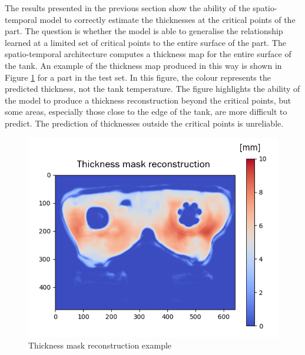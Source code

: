 The results presented in the previous section show the ability of the spatio-temporal model to correctly estimate the thicknesses at the critical points of the part. The question is whether the model is able to generalise the relationship learned at a limited set of critical points to the entire surface of the part. The spatio-temporal architecture computes a thickness map for the entire surface of the tank. An example of the thickness map produced in this way is shown in Figure \ref{fig:thickness_mask_reconstruction} for a part in the test set. 
In this figure, the colour represents the predicted thickness, not the tank temperature.
The figure highlights the ability of the model to produce a thickness reconstruction beyond the critical points, but some areas, especially those close to the edge of the tank, are more difficult to predict. 
The prediction of thicknesses outside the critical points is unreliable.

\begin{figure}
\centering
\includegraphics[scale=0.90]{images/chapter_4/mask_reconstruction.png}
\caption{Thickness mask reconstruction example}
\label{fig:thickness_mask_reconstruction}
\end{figure}


